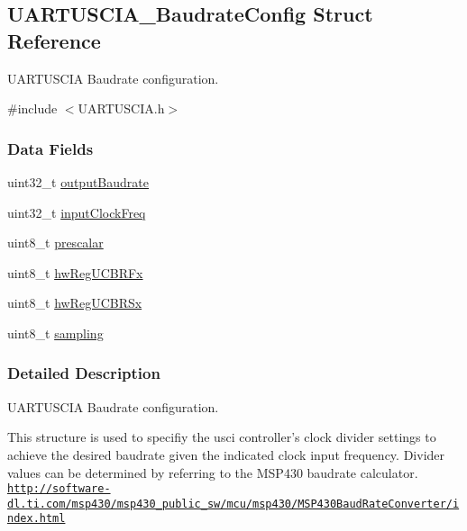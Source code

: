 \subsection{U\-A\-R\-T\-U\-S\-C\-I\-A\-\_\-\-Baudrate\-Config Struct Reference}
\label{struct_u_a_r_t_u_s_c_i_a___baudrate_config}


U\-A\-R\-T\-U\-S\-C\-I\-A Baudrate configuration.  




{\ttfamily \#include $<$U\-A\-R\-T\-U\-S\-C\-I\-A.\-h$>$}

\subsubsection*{Data Fields}
\begin{DoxyCompactItemize}
\item 
uint32\-\_\-t \hyperlink{struct_u_a_r_t_u_s_c_i_a___baudrate_config_acd162ef89249236d66c6888fcccd36cc}{output\-Baudrate}
\item 
uint32\-\_\-t \hyperlink{struct_u_a_r_t_u_s_c_i_a___baudrate_config_ab26172da351b915ec47148df5f601573}{input\-Clock\-Freq}
\item 
uint8\-\_\-t \hyperlink{struct_u_a_r_t_u_s_c_i_a___baudrate_config_a6edfa7183e52dd91e3fa62ad5a186d02}{prescalar}
\item 
uint8\-\_\-t \hyperlink{struct_u_a_r_t_u_s_c_i_a___baudrate_config_ad0e8c8dfaee0456a272bcaf7625b5998}{hw\-Reg\-U\-C\-B\-R\-Fx}
\item 
uint8\-\_\-t \hyperlink{struct_u_a_r_t_u_s_c_i_a___baudrate_config_a638b5df1c71e9495f489a1e4ea5aa2c4}{hw\-Reg\-U\-C\-B\-R\-Sx}
\item 
uint8\-\_\-t \hyperlink{struct_u_a_r_t_u_s_c_i_a___baudrate_config_a6c78a1a4babef0a3723616d2ae4e7b9e}{sampling}
\end{DoxyCompactItemize}


\subsubsection{Detailed Description}
U\-A\-R\-T\-U\-S\-C\-I\-A Baudrate configuration. 

This structure is used to specifiy the usci controller's clock divider settings to achieve the desired baudrate given the indicated clock input frequency. Divider values can be determined by referring to the M\-S\-P430 baudrate calculator. \href{http://software-dl.ti.com/msp430/msp430_public_sw/mcu/msp430/MSP430BaudRateConverter/index.html}{\tt http\-://software-\/dl.\-ti.\-com/msp430/msp430\-\_\-public\-\_\-sw/mcu/msp430/\-M\-S\-P430\-Baud\-Rate\-Converter/index.\-html}

